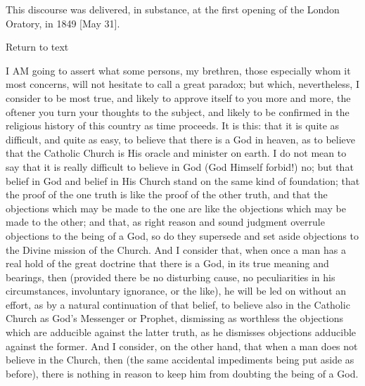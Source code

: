 
This discourse was delivered, in substance, at the first opening of
the London Oratory, in 1849 [May 31].

Return to text


I AM going to assert what some persons, my brethren, those
especially whom it most concerns, will not hesitate to call a great
paradox; but which, nevertheless, I consider to be most true, and
likely to approve itself to you more and more, the oftener you turn
your thoughts to the subject, and likely to be confirmed in the
religious history of this country as time proceeds. It is this: that
it is quite as difficult, and quite as easy, to believe that there is
a God in heaven, as to believe that the Catholic Church is His oracle
and minister on earth. I do not mean to say that it is really
difficult to believe in God (God Himself forbid!) no; but that belief
in God and belief in His Church stand on the same kind of foundation;
that the proof of the one truth is like the proof of the other truth,
and that the objections which may be made to the one are like the
objections which may be made to the other; and that, as right reason
and sound judgment overrule objections to the being of a God, so do
they supersede and set aside objections to the Divine mission of the
Church. And I consider that, when once a man has a real hold of the
great doctrine that there is a God, in its true meaning and bearings,
then (provided there be no disturbing cause, no peculiarities in his
circumstances, involuntary ignorance, or the like), he will be led on
without an effort, as by a natural continuation of that belief, to
believe also in the Catholic Church as God's Messenger or Prophet,
dismissing as worthless the objections which are adducible against the
latter truth, as he dismisses objections adducible against the former.
And I consider, on the other hand, that when a man does not believe in
the Church, then (the same accidental impediments being put aside as
before), there is nothing in reason to keep him from doubting the
being of a God.


